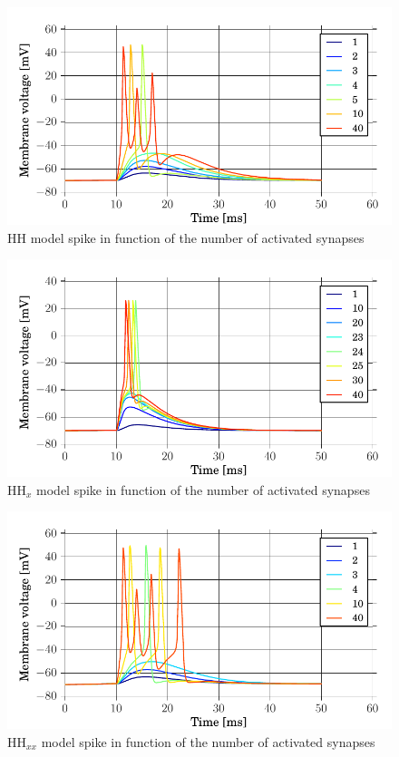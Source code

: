 \documentclass[a4paper, 10pt, conference]{ieeeconf}      %
\begin{document}
\begin{figure}
\includegraphics[width=\columnwidth]{../figures/1_3-HH_synapse_number.pdf}

\caption{HH model spike in function of the number of activated synapses}
\label{fig:1_3a}
\end{figure}

\begin{figure}
\includegraphics[width=\columnwidth]{../figures/1_3-HHx_synapse_number.pdf}

\caption{HH$_x$ model spike in function of the number of activated synapses}
\label{fig:1_3b}
\end{figure}

\begin{figure}
\includegraphics[width=\columnwidth]{../figures/1_3-HHxx_synapse_number.pdf}

\caption{HH$_{xx}$ model spike in function of the number of activated synapses}
\label{fig:1_3c}
\end{figure}
\end{document}
